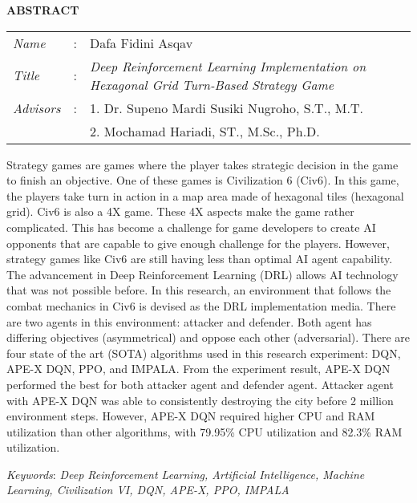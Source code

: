 \begin{center}
  \large\textbf{ABSTRACT}
\end{center}


\vspace{2ex}

\begingroup
  \setlength{\tabcolsep}{0pt}

  \noindent
  \begin{tabularx}{\textwidth}{l >{\centering}m{3em} X}
    \emph{Name}     &:& Dafa Fidini Asqav \\

    \emph{Title}    &:& \emph{Deep Reinforcement Learning Implementation on Hexagonal Grid Turn-Based Strategy Game} \\

    \emph{Advisors} &:& 1. Dr. Supeno Mardi Susiki Nugroho, S.T., M.T. \\
                    & & 2. Mochamad Hariadi, ST., M.Sc., Ph.D. \\
  \end{tabularx}
\endgroup

Strategy games are games where the player takes strategic decision in the game to finish an objective.
One of these games is Civilization 6 (Civ6).
In this game, the players take turn in action in a map area made of hexagonal tiles (hexagonal grid).
Civ6 is also a 4X game. These 4X aspects make the game rather complicated.
This has become a challenge for game developers to create AI opponents that are capable to give enough challenge for the players.
However, strategy games like Civ6 are still having less than optimal AI agent capability.
The advancement in Deep Reinforcement Learning (DRL) allows AI technology that was not possible before.
In this research, an environment that follows the combat mechanics in Civ6 is devised as the
DRL implementation media. There are two agents in this environment: attacker and defender.
Both agent has differing objectives (asymmetrical) and oppose each other (adversarial).
There are four state of the art (SOTA) algorithms used in this research experiment: DQN, APE-X DQN,
PPO, and IMPALA.
From the experiment result, APE-X DQN performed the best for both attacker agent and defender agent.
Attacker agent with APE-X DQN was able to consistently destroying the city before 2 million environment steps.
However, APE-X DQN required higher CPU and RAM utilization than other algorithms,
with 79.95\% CPU utilization and 82.3\% RAM utilization.

\emph{Keywords}: \emph{Deep Reinforcement Learning, Artificial Intelligence, Machine Learning, Civilization VI, DQN, APE-X, PPO, IMPALA}
